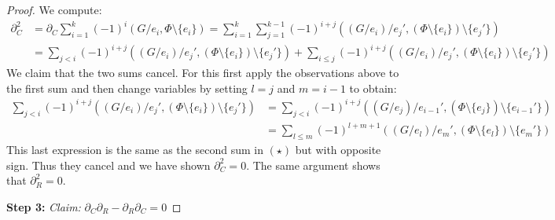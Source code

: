 \begin{proof}
	We compute:
	\begin{align*}
		\partial_{C}^2 &= \partial_{C} \sum_{i=1}^{k} (-1)^{i}(G / e_{i}, \Phi \setminus \{e_{i}\})
		=  \sum_{i=1}^{k} \sum_{j=1}^{k-1} (-1)^{i+j}((G / e_{i}) / e_{j}', (\Phi \setminus \{e_{i}\} ) \setminus \{e_{j}'\})  \\
					   &= \sum_{j < i} (-1)^{i+j} ((G / e_{i}) / e_{j}', (\Phi \setminus \{e_{i}\} ) \setminus \{e_{j}'\}) + \sum_{i \leq j} (-1)^{i+j}
					   ((G / e_{i}) / e_{j}', (\Phi \setminus \{e_{i}\} ) \setminus \{e_{j}'\}) \tag{$\star$}
	\end{align*}
	We claim that the two sums cancel. For this first apply the observations above to the first sum and then change variables by setting $l = j$ and  $m = i-1$ to obtain:
	\begin{align*}
		\sum_{j < i} (-1)^{i+j} ((G / e_{i}) / e_{j}', (\Phi \setminus \{e_{i}\}) \setminus \{e_{j}'\} ) &= 
		\sum_{j < i} (-1)^{i+j}((G / e_{j}) / e_{i-1}', (\Phi \setminus \{e_{j}\}) \setminus \{e_{i-1}'\} ) \\ 
		&= \sum_{l \leq m} (-1)^{l+m+1} ((G / e_{l}) / e_{m}', (\Phi \setminus \{e_{l}\}) \setminus \{e_{m}'\} ) 
	\end{align*}
	This last expression is the same as the second sum in $(\star)$ but with opposite sign. Thus they cancel and we have shown $\partial_{C}^2 = 0$.
	The same argument shows that $\partial_{R}^2 = 0$.

	\textbf{Step 3:} \emph{Claim:} $\partial_{C} \partial_{R} - \partial_{R} \partial_{C} = 0$


\end{proof}

